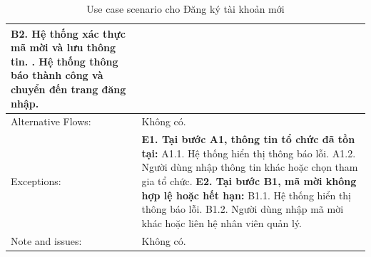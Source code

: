 \begin{table}[H]
\begin{tabular}{|l|l|l|l|}
{                \hspace{1cm}B2. Hệ thống xác thực mã mời và lưu thông tin. \newline
            3. Hệ thống thông báo thành công và chuyển đến trang đăng nhập.
        } \\ 
        \hline Alternative Flows: & \multicolumn{3}{|p{12cm}|}{Không có.} \\ 
        \hline Exceptions: & \multicolumn{3}{|p{12cm}|}{
            \textbf{E1. Tại bước A1, thông tin tổ chức đã tồn tại:} \newline
            \hspace{0.5cm}A1.1. Hệ thống hiển thị thông báo lỗi. \newline
            \hspace{0.5cm}A1.2. Người dùng nhập thông tin khác hoặc chọn tham gia tổ chức. \newline
            \textbf{E2. Tại bước B1, mã mời không hợp lệ hoặc hết hạn:} \newline
            \hspace{0.5cm}B1.1. Hệ thống hiển thị thông báo lỗi. \newline
            \hspace{0.5cm}B1.2. Người dùng nhập mã mời khác hoặc liên hệ nhân viên quản lý. 
        } \\ 
		\hline Note and issues: & \multicolumn{3}{|p{12cm}|}{Không có.} \\ 
		\hline
	\end{tabular}
	\caption{Use case scenario cho Đăng ký tài khoản mới}
\end{table}


